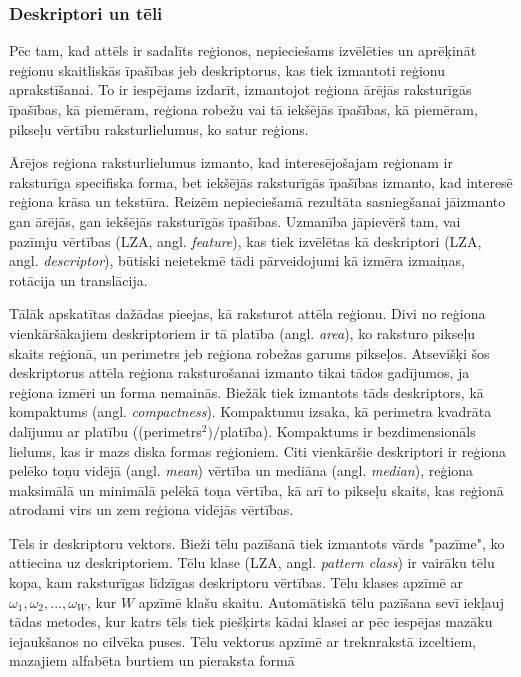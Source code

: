 \documentclass[12pt,paper=a4]{report}
\begin{document}
\subsubsection{Deskriptori un tēli}Pēc tam, kad attēls ir sadalīts reģionos, nepieciešams izvēlēties un aprēķināt reģionu skaitliskās īpašības jeb deskriptorus, kas tiek izmantoti reģionu aprakstīšanai. To ir iespējams izdarīt, izmantojot reģiona ārējās raksturīgās īpašības, kā piemēram, reģiona robežu vai tā iekšējās īpašības, kā piemēram, pikseļu vērtību raksturlielumus, ko satur reģions. \cite{gonzalez2002digital}\par
Ārējos reģiona raksturlielumus izmanto, kad interesējošajam reģionam ir raksturīga specifiska forma, bet iekšējās raksturīgās īpašības izmanto, kad interesē reģiona krāsa un tekstūra. Reizēm nepieciešamā rezultāta sasniegšanai jāizmanto gan ārējās, gan iekšējās raksturīgās īpašības. Uzmanība jāpievērš tam, vai pazīmju vērtības (LZA, angl. \textit{feature}), kas tiek izvēlētas kā deskriptori (LZA, angl. \textit{descriptor}), būtiski neietekmē tādi pārveidojumi kā izmēra izmaiņas, rotācija un translācija.  \cite{gonzalez2002digital}\par
Tālāk apskatītas dažādas pieejas, kā raksturot attēla reģionu. Divi no reģiona vienkāršākajiem deskriptoriem ir tā platība (angl. \textit{area}), ko raksturo pikseļu skaits reģionā, un perimetrs jeb reģiona robežas garums pikseļos. Atsevišķi šos deskriptorus attēla reģiona raksturošanai izmanto tikai tādos gadījumos, ja reģiona izmēri un forma nemainās. Biežāk tiek izmantots tāds deskriptors, kā kompaktums (angl. \textit{compactness}). Kompaktumu izsaka, kā perimetra kvadrāta dalījumu ar platību ((perimetrs$^2)/$platība). Kompaktums ir bezdimensionāls lielums, kas ir mazs diska formas reģioniem. Citi vienkāršie deskriptori ir reģiona pelēko toņu vidējā (angl. \textit{mean}) vērtība un mediāna (angl. \textit{median}), reģiona maksimālā un minimālā pelēkā toņa vērtība, kā arī to pikseļu skaits, kas reģionā atrodami virs un zem reģiona vidējās vērtības. \cite{gonzalez2002digital}\par
Tēls ir deskriptoru vektors. Bieži tēlu pazīšanā tiek izmantots vārds "pazīme", ko attiecina uz deskriptoriem. Tēlu klase (LZA, angl. \textit{pattern class}) ir vairāku tēlu kopa, kam raksturīgas līdzīgas deskriptoru vērtības. Tēlu klases apzīmē ar $ \omega_1, \omega_2, ..., \omega_W $, kur $W$ apzīmē klašu skaitu. Automātiskā tēlu pazīšana sevī iekļauj tādas metodes, kur katrs tēls tiek piešķirts kādai klasei ar pēc iespējas mazāku iejaukšanos no cilvēka puses. Tēlu vektorus apzīmē ar treknrakstā izceltiem, mazajiem alfabēta burtiem un pieraksta formā 
\end{document}
